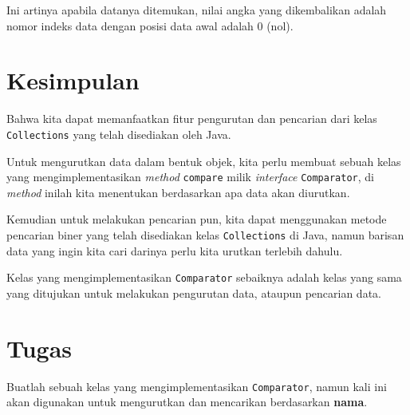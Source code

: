 Ini artinya apabila datanya ditemukan, nilai angka yang dikembalikan adalah nomor indeks data dengan posisi data awal adalah 0 (nol).

\section{Kesimpulan}

Bahwa kita dapat memanfaatkan fitur pengurutan dan pencarian dari kelas \texttt{Collections} yang telah disediakan oleh Java.

Untuk mengurutkan data dalam bentuk objek, kita perlu membuat sebuah kelas yang mengimplementasikan \textit{method} \texttt{compare} milik \textit{interface} \texttt{Comparator}, di \textit{method} inilah kita menentukan berdasarkan apa data akan diurutkan.

Kemudian untuk melakukan pencarian pun, kita dapat menggunakan metode pencarian biner yang telah disediakan kelas \texttt{Collections} di Java, namun barisan data yang ingin kita cari darinya perlu kita urutkan terlebih dahulu.

Kelas yang mengimplementasikan \texttt{Comparator} sebaiknya adalah kelas yang sama yang ditujukan untuk melakukan pengurutan data, ataupun pencarian data.

\section{Tugas}

Buatlah sebuah kelas yang mengimplementasikan \texttt{Comparator}, namun kali ini akan digunakan untuk mengurutkan dan mencarikan berdasarkan \textbf{nama}.